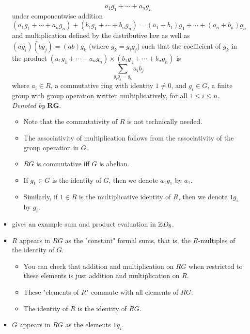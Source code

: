 \documentclass[../notes.tex]{subfiles}
\begin{document}
\begin{itemize}
    \begin{equation*}
        a_1g_1+\cdots+a_ng_n
    \end{equation*}
    under componentwise addition
    \begin{equation*}
        (a_1g_1+\cdots+a_ng_n)+(b_1g_1+\cdots+b_ng_n) = (a_1+b_1)g_1+\cdots+(a_n+b_n)g_n
    \end{equation*}
    and multiplication defined by the distributive law as well as $(ag_i)(bg_j)=(ab)g_k$ (where $g_k=g_ig_j$) such that the coefficient of $g_k$ in the product $(a_1g_1+\cdots+a_ng_n)\times(b_1g_1+\cdots+b_ng_n)$ is
    \begin{equation*}
        \sum_{g_ig_j=g_k}a_ib_j
    \end{equation*}
    where $a_i\in R$, a commutative ring with identity $1\neq 0$, and $g_i\in G$, a finite group with group operation written multiplicatively, for all $1\leq i\leq n$. \emph{Denoted by} $\bm{RG}$.
    \begin{itemize}
        \item Note that the commutativity of $R$ is not technically needed.
        \item The associativity of multiplication follows from the associativity of the group operation in $G$.
        \item $RG$ is commutative iff $G$ is abelian.
        \item If $g_1\in G$ is the identity of $G$, then we denote $a_1g_1$ by $a_1$.
        \item Similarly, if $1\in R$ is the multiplicative identity of $R$, then we denote $1g_i$ by $g_i$.
    \end{itemize}
    \item \textcite{bib:DummitFoote} gives an example sum and product evaluation in $\mathbb{Z} D_8$.
    \item $R$ appears in $RG$ as the "constant" formal sums, that is, the $R$-multiples of the identity of $G$.
    \begin{itemize}
        \item You can check that addition and multiplication on $RG$ when restricted to these elements is just addition and multiplication on $R$.
        \item These "elements of $R$" commute with all elements of $RG$.
        \item The identity of $R$ is the identity of $RG$.
    \end{itemize}
    \item $G$ appears in $RG$ as the elements $1g_i$.

\end{itemize}
\end{document}
